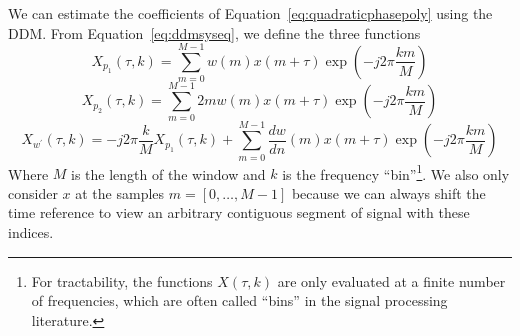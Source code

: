 We can estimate the coefficients of Equation~\ref{eq:quadraticphasepoly} using the DDM. From
Equation~\ref{eq:ddmsyseq}, we define the three functions
\begin{equation}
    X_{p_{1}} \left( \tau, k \right)
    =
    \sum_{m=0}^{M-1} w(m) x(m + \tau) \exp(-j 2 \pi \frac{k m}{M})
\end{equation}
\begin{equation}
    X_{p_{2}} \left( \tau, k \right)
    =
    \sum_{m=0}^{M-1} 2 m w(m) x(m + \tau) \exp(-j 2 \pi \frac{k m}{M})
\end{equation}
\begin{equation}
    X_{w^{\prime}} \left( \tau, k \right)
    =
    -j 2 \pi \frac{k}{M} X_{p_{1}} \left( \tau , k \right) + 
    \sum_{m=0}^{M-1} \frac{dw}{dn}(m) x(m + \tau) \exp(-j 2 \pi \frac{k m}{M})
\end{equation}
Where $M$ is the length of the window and $k$ is the frequency
``bin''\footnote{For tractability, the functions $X(\tau,k)$ are only evaluated at
    a finite number of frequencies, which are often called ``bins'' in the
signal processing literature.}. We also
only consider $x$ at the samples $m = [0, \dotsc, M-1]$ because we can always
shift the time reference to view an arbitrary contiguous segment of signal with
these indices.

